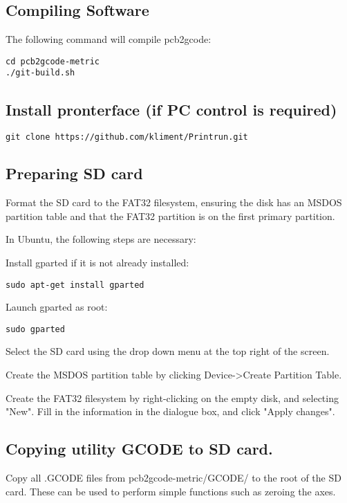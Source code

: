 \documentclass[a4paper,11pt]{article}  %
\begin{document}
\subsection{Compiling Software}
The following command will compile pcb2gcode:
\begin{lstlisting}[frame=single,breaklines=true]
cd pcb2gcode-metric
./git-build.sh
\end{lstlisting}

\subsection{Install pronterface (if PC control is required)}
\begin{lstlisting}[frame=single,breaklines=true]
git clone https://github.com/kliment/Printrun.git
\end{lstlisting}


\subsection{Preparing SD card}
Format the SD card to the FAT32 filesystem, ensuring the disk has an
MSDOS partition table and that the FAT32 partition is on the first
primary partition.

In Ubuntu, the following steps are necessary:

Install gparted if it is not already installed:

\begin{lstlisting}[frame=single,breaklines=true]
sudo apt-get install gparted
\end{lstlisting}

Launch gparted as root:
\begin{lstlisting}[frame=single,breaklines=true]
sudo gparted
\end{lstlisting}

Select the SD card using the drop down menu at the top right of the
screen.

Create the MSDOS partition table by clicking Device-\textgreater Create Partition Table.

Create the FAT32 filesystem by right-clicking on the empty disk, and selecting "New". 
Fill in the information in the dialogue box, and click "Apply changes". 

\subsection{Copying utility GCODE to SD card.}
Copy all .GCODE files from pcb2gcode-metric/GCODE/ to the root of the SD card.
These can be used to perform simple functions such as zeroing the axes.
\end{document}
